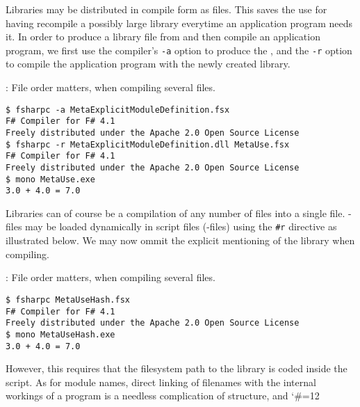 Libraries may be distributed in compile form as  files. This saves the use for having recompile a possibly large library everytime an application program needs it. In order to produce a library file from  and then compile an application program, we first use the compiler's \lstinline[language=console]{-a} option to produce the , and the \lstinline[language=console]{-r} option to compile the application program with the newly created library.
\begin{codeNOutput}{: File order matters, when compiling several files.}
\begin{lstlisting}[language=console,escapechar=§]
$ fsharpc -a MetaExplicitModuleDefinition.fsx
F# Compiler for F# 4.1
Freely distributed under the Apache 2.0 Open Source License
$ fsharpc -r MetaExplicitModuleDefinition.dll MetaUse.fsx 
F# Compiler for F# 4.1
Freely distributed under the Apache 2.0 Open Source License
$ mono MetaUse.exe 
3.0 + 4.0 = 7.0
\end{lstlisting}%
\end{codeNOutput}
Libraries can of course be a compilation of any number of files into a single  file. -files may be loaded dynamically in script files (-files) using the \lstinline{#r} directive as illustrated below.
%
%
We may now ommit the explicit mentioning of the library when compiling.
\begin{codeNOutput}{: File order matters, when compiling several files.}
\begin{lstlisting}[language=console,escapechar=§]
$ fsharpc MetaUseHash.fsx 
F# Compiler for F# 4.1
Freely distributed under the Apache 2.0 Open Source License
$ mono MetaUseHash.exe 
3.0 + 4.0 = 7.0
\end{lstlisting}
\end{codeNOutput}
However, this requires that the filesystem path to the library is coded inside the script. As for module names, direct linking of filenames with the internal workings of a program is a needless complication of structure, and 
\begingroup %
\catcode`\#=12
\endgroup


